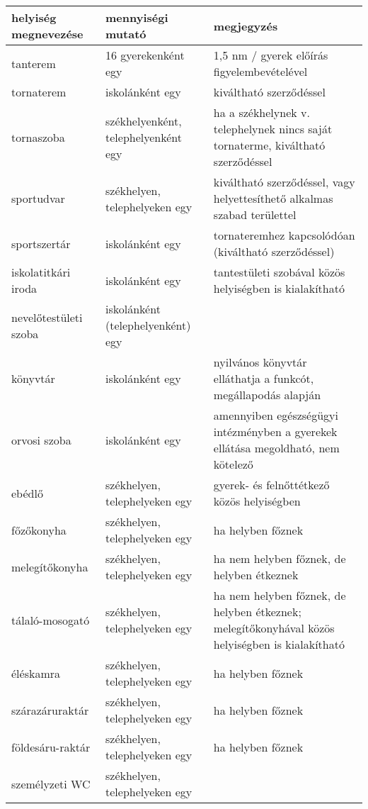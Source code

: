 \begin{longtable}{@{}p{4cm}|p{4cm}|p{6cm}@{}}

    \textbf{helyiség megnevezése} & \textbf{mennyiségi mutató}
                                  & \textbf{megjegyzés}
    \\ \hline
    tanterem                      & 16 gyerekenként egy                 &
    1,5 nm /
    gyerek előírás figyelembevételével
    \\ \hline
    tornaterem                    & iskolánként egy                     &
    kiváltható
    szerződéssel
    \\ \hline
    tornaszoba                    & székhelyenként, telephelyenként egy &
    ha a
    székhelynek v. telephelynek nincs saját tornaterme, kiváltható szerződéssel
    \\ \hline
    sportudvar                    & székhelyen, telephelyeken egy       &
    kiváltható
    szerződéssel, vagy helyettesíthető alkalmas szabad területtel
    \\ \hline
    sportszertár                  & iskolánként egy                     &
    tornateremhez kapcsolódóan (kiváltható szerződéssel)
    \\ \hline
    iskolatitkári iroda           & iskolánként egy                     &
    tantestületi szobával közös helyiségben  is kialakítható
    \\ \hline
    nevelőtestületi szoba         & iskolánként (telephelyenként) egy   &

    \\ \hline
    könyvtár                      & iskolánként egy                     &
    nyilvános
    könyvtár elláthatja a funkcót, megállapodás alapján
    \\ \hline
    orvosi szoba                  & iskolánként egy                     &
    amennyiben
    egészségügyi intézményben a gyerekek ellátása megoldható, nem kötelező
    \\
    \hline
    ebédlő                        & székhelyen, telephelyeken egy       &
    gyerek- és
    felnőttétkező közös helyiségben
    \\ \hline
    főzőkonyha                    & székhelyen, telephelyeken egy       &
    ha helyben
    főznek
    \\ \hline
    melegítőkonyha                & székhelyen, telephelyeken egy       &
    ha nem
    helyben főznek, de helyben étkeznek
    \\ \hline
    tálaló-mosogató               & székhelyen, telephelyeken egy       &
    ha nem
    helyben főznek, de helyben étkeznek; melegítőkonyhával közös helyiségben
    is
    kialakítható
    \\ \hline
    éléskamra                     & székhelyen, telephelyeken egy       &
    ha helyben
    főznek
    \\ \hline
    szárazáruraktár               & székhelyen, telephelyeken egy       &
    ha helyben
    főznek
    \\ \hline
    földesáru-raktár              & székhelyen, telephelyeken egy       &
    ha helyben
    főznek
    \\ \hline
    személyzeti WC                & székhelyen, telephelyeken egy       &


\end{longtable}
